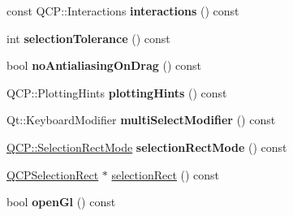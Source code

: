 \begin{DoxyCompactItemize}
\item 
const Q\+C\+P\+::\+Interactions {\bfseries interactions} () const \hypertarget{classQCustomPlot_a12401c02b6949a717f5749bb28c62983}{}\label{classQCustomPlot_a12401c02b6949a717f5749bb28c62983}

\item 
int {\bfseries selection\+Tolerance} () const \hypertarget{classQCustomPlot_a7b738074c75e80070ef6a10263c6cd69}{}\label{classQCustomPlot_a7b738074c75e80070ef6a10263c6cd69}

\item 
bool {\bfseries no\+Antialiasing\+On\+Drag} () const \hypertarget{classQCustomPlot_ae07f2895a34d13a97a10cae4d8e17a36}{}\label{classQCustomPlot_ae07f2895a34d13a97a10cae4d8e17a36}

\item 
Q\+C\+P\+::\+Plotting\+Hints {\bfseries plotting\+Hints} () const \hypertarget{classQCustomPlot_a130b55e205697a5288081e9fc11e443e}{}\label{classQCustomPlot_a130b55e205697a5288081e9fc11e443e}

\item 
Qt\+::\+Keyboard\+Modifier {\bfseries multi\+Select\+Modifier} () const \hypertarget{classQCustomPlot_a9b6b1a0fea8da3fda6d5e3d687202877}{}\label{classQCustomPlot_a9b6b1a0fea8da3fda6d5e3d687202877}

\item 
\hyperlink{namespaceQCP_ac9aa4d6d81ac76b094f9af9ad2d3aacf}{Q\+C\+P\+::\+Selection\+Rect\+Mode} {\bfseries selection\+Rect\+Mode} () const \hypertarget{classQCustomPlot_afae2023152cd30e7052b536148226a04}{}\label{classQCustomPlot_afae2023152cd30e7052b536148226a04}

\item 
\hyperlink{classQCPSelectionRect}{Q\+C\+P\+Selection\+Rect} $\ast$ \hyperlink{classQCustomPlot_ae64a3994735d8f592a60d9430526a163}{selection\+Rect} () const 
\item 
bool {\bfseries open\+Gl} () const \hypertarget{classQCustomPlot_ab81fd5b380574c6dee92b6d8c8fd1b18}{}\label{classQCustomPlot_ab81fd5b380574c6dee92b6d8c8fd1b18}


\end{DoxyCompactItemize}
